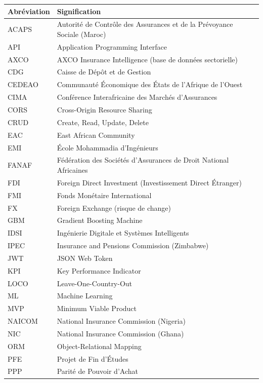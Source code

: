 \documentclass[12pt,a4paper]{report}
\begin{document}
\begin{center}
\begin{tabular}{@{}p{3cm}p{11.5cm}@{}}
\toprule
\textbf{Abréviation} & \textbf{Signification} \\
\midrule
ACAPS   & Autorité de Contrôle des Assurances et de la Prévoyance Sociale (Maroc) \\
API     & Application Programming Interface \\
AXCO    & AXCO Insurance Intelligence (base de données sectorielle) \\
CDG     & Caisse de Dépôt et de Gestion \\
CEDEAO  & Communauté Économique des États de l'Afrique de l'Ouest \\
CIMA    & Conférence Interafricaine des Marchés d'Assurances \\
CORS    & Cross-Origin Resource Sharing \\
CRUD    & Create, Read, Update, Delete \\
EAC     & East African Community \\
EMI     & École Mohammadia d'Ingénieurs \\
FANAF   & Fédération des Sociétés d'Assurances de Droit National Africaines \\
FDI     & Foreign Direct Investment (Investissement Direct Étranger) \\
FMI     & Fonds Monétaire International \\
FX      & Foreign Exchange (risque de change) \\
GBM     & Gradient Boosting Machine \\
IDSI    & Ingénierie Digitale et Systèmes Intelligents \\
IPEC    & Insurance and Pensions Commission (Zimbabwe) \\
JWT     & JSON Web Token \\
KPI     & Key Performance Indicator \\
LOCO    & Leave-One-Country-Out \\
ML      & Machine Learning \\
MVP     & Minimum Viable Product \\
NAICOM  & National Insurance Commission (Nigeria) \\
NIC     & National Insurance Commission (Ghana) \\
ORM     & Object-Relational Mapping \\
PFE     & Projet de Fin d'Études \\
PPP     & Parité de Pouvoir d'Achat \\

\end{tabular}
\end{center}
\end{document}
